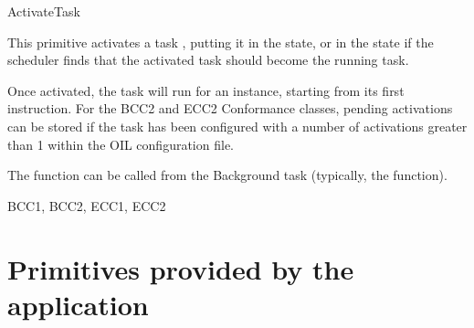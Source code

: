 \begin{function}{ActivateTask}
  
  \begin{fundescription}
    This primitive activates a task , putting it in the
     state, or in the  state if the
    scheduler finds that the activated task should become the running
    task.

    Once activated, the task will run for an instance, starting from
    its first instruction. For the BCC2 and ECC2 Conformance classes,
    pending activations can be stored if the task has been configured
    with a number of activations greater than 1 within the OIL
    configuration file.

    The function can be called from the Background task (typically,
    the  function).

  \end{fundescription}
  
  \begin{funparameters}
  \end{funparameters}
  
  \begin{funreturn}
  \end{funreturn}
  
  \begin{funconformance}
    BCC1, BCC2, ECC1, ECC2
  \end{funconformance}
\end{function}


\pagebreak






\section{Primitives provided by the application}


\pagebreak





